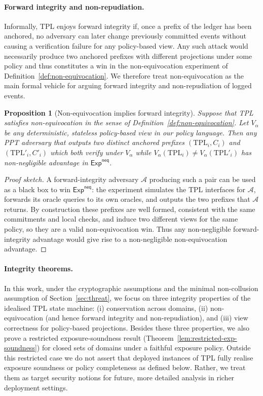 \documentclass[11pt]{article}
\newtheorem{proposition}{Proposition}
\begin{document}
\paragraph{Forward integrity and non-repudiation.}
Informally, TPL enjoys forward integrity if, once a prefix of the ledger has been anchored, no adversary can later change previously committed events without causing a verification failure for any policy-based view.
Any such attack would necessarily produce two anchored prefixes with different projections under some policy and thus constitutes a win in the non-equivocation experiment of Definition~\ref{def:non-equivocation}.
We therefore treat non-equivocation as the main formal vehicle for arguing forward integrity and non-repudiation of logged events.
\begin{proposition}[Non-equivocation implies forward integrity]\label{prop:neq-forward}
Suppose that TPL satisfies non-equivocation in the sense of Definition~\ref{def:non-equivocation}.
Let $V_\alpha$ be any deterministic, stateless policy-based view in our policy language.
Then any PPT adversary that outputs two distinct anchored prefixes $(\mathrm{TPL}_i,C_i)$ and $(\mathrm{TPL}'_i,C'_i)$ which both verify under $V_\alpha$ while $V_\alpha(\mathrm{TPL}_i) \neq V_\alpha(\mathrm{TPL}'_i)$ has non-negligible advantage in $\mathsf{Exp}^{\mathsf{neq}}$.
\end{proposition}
\begin{proof}[Proof sketch]
A forward-integrity adversary $\mathcal{A}$ producing such a pair can be used as a black box to win $\mathsf{Exp}^{\mathsf{neq}}$:
the experiment simulates the TPL interfaces for $\mathcal{A}$, forwards its oracle queries to its own oracles, and outputs the two prefixes that $\mathcal{A}$ returns.
By construction these prefixes are well formed, consistent with the same commitments and local checks, and induce two different views for the same policy, so they are a valid non-equivocation win.
Thus any non-negligible forward-integrity advantage would give rise to a non-negligible non-equivocation advantage.
\end{proof}

\paragraph{Integrity theorems.}
In this work, under the cryptographic assumptions and the minimal non-collusion assumption of Section~\ref{sec:threat},
we focus on three integrity properties of the idealised TPL state machine:
(i) conservation across domains, (ii) non-equivocation (and hence forward integrity and non-repudiation),
and (iii) view correctness for policy-based projections.
Besides these three properties, we also prove a restricted exposure-soundness result (Theorem~\ref{lem:restricted-exp-soundness}) for closed sets of domains under a faithful exposure policy.
Outside this restricted case we do not assert that deployed instances of TPL fully realise exposure soundness or policy completeness as defined below. Rather, we treat them as target security notions for future, more detailed analysis in richer deployment settings.
\end{document}
